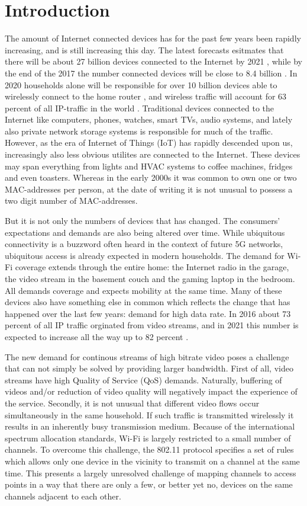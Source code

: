 \chapter{Introduction}
The amount of Internet connected devices has for the past few years been rapidly increasing, and is still increasing this day. The latest forecasts
esitmates that there will be about 27 billion devices connected to the Internet by 2021 \cite{CiscoVNI2017}, while by the end of the 2017 the number
connected devices will be close to 8.4 billion \cite{Gartner}. In 2020 households alone will be responsible for over 10 billion devices
able to wirelessly connect to the home router \cite{wifialliance}, and wireless traffic will account for 63 percent of all IP-traffic in the world \cite{CiscoVNI2017}. 
Traditional devices connected to the Internet like computers, phones, watches, smart TVs, audio systems, and lately also private network storage systems is responsible
for much of the traffic. However, as the era of Internet of Things (IoT) has rapidly descended upon us, increasingly also less obvious utilites are connected to the Internet.
These devices may span everything from lights and HVAC systems to coffee machines, fridges and even toasters. Whereas in the early 2000s it was common to own 
one or two MAC-addresses per person, at the date of writing it is not unusual to possess a two digit number of MAC-addresses.

But it is not only the numbers of devices that has changed. The consumers' expectations and demands are also being altered over time. 
While ubiquitous connectivity is a buzzword often heard in the context of future 5G networks, ubiquitous access is already expected in
modern households. The demand for Wi-Fi coverage extends through the entire home: the Internet radio in the garage, the video stream in the basement
couch and the gaming laptop in the bedroom. All demands coverage and expects mobility at the same time. Many of these devices also have something else in
common which reflects the change that has happened over the last few years: demand for high data rate. In 2016 about 73 percent of all IP traffic orginated from video
streams, and in 2021 this number is expected to increase all the way up to 82 percent \cite{CiscoVNI2017}. 

The new demand for continous streams of high bitrate video poses a challenge that can not simply be solved by providing larger bandwidth. First of all, video streams
have high Quality of Service (QoS) demands. Naturally, buffering of videos and/or reduction of video quality will negatively impact the experience of the service.
Secondly, it is not unusual that different video flows occur simultaneously in the same household. If such traffic is transmitted wirelessly
it results in an inherently busy transmission medium. Because of the international spectrum allocation standards, Wi-Fi is largely restricted to a small number of channels.
To overcome this challenge, the 802.11 protocol specifies a set of rules which allows only one device in the vicinity to transmit on a channel at the same time. 
This presents a largely unresolved challenge of mapping channels to access points in a way that there are only a few, or better yet no, devices on the same channels adjacent
to each other.

